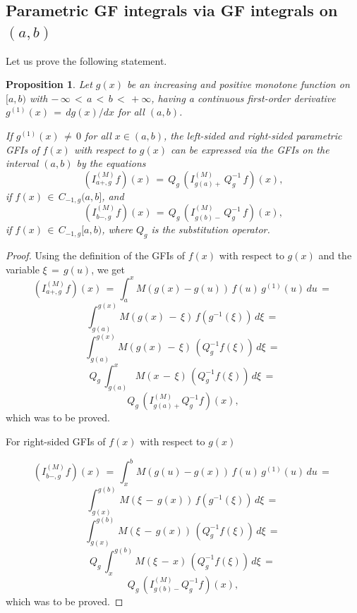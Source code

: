 \documentclass[12pt]{article}
\newtheorem{Proposition}{Proposition}
\begin{document}


\subsection{Parametric GF integrals via GF integrals on $(a,b)$}


Let us prove the following statement.

\begin{Proposition} \label{PGFI-GFIab}
Let $g(x)$ be an increasing and positive monotone function on $[a, b)$ 
with $ - \, \infty \, < \, a \, < \, b \, < \, +\infty$, 
having a continuous first-order derivative $g^{(1)}(x) \, = \, dg(x)/dx$ for all $(a,b)$.

If $g^{(1)}(x) \, \ne \, 0$ for all $x \in (a,b)$,
the left-sided and right-sided parametric GFIs of $f(x)$ with respect to $g(x)$ can be expressed via 
the GFIs on the interval $(a,b)$ by the equations
\begin{equation} \label{I-QIQ-l}
(I^{(M)}_{a+,g} f)(x) \, = \, 
Q_{g} \, (I^{(M)}_{g(a)+} \, Q^{-1}_g \, f)(x) ,
\end{equation}
if $f(x) \, \in \,C_{-1,g}(a,b]$, and
\begin{equation} \label{I-QIQ-r}
(I^{(M)}_{b-,g} f)(x) \, = \, 
Q_{g} \, (I^{(M)}_{g(b)-} \, Q^{-1}_g \, f)(x) ,
\end{equation}
if $f(x) \, \in \, C_{-1,g}[a,b)$, 
where $Q_g$ is the substitution operator.

\end{Proposition}


\begin{proof}

Using the definition of the GFIs of $f(x)$ with respect to $g(x)$
and the variable $\xi \, = \, g(u)$, we get
\[
(I^{(M)}_{a+,g} f)(x) \, = \, 
\int^x_a M(g(x)-g(u)) \, f(u) \, g^{(1)}(u) \, du 
\, = \, 
\]
\[
\int^{g(x)}_{g(a)} M(g(x) \, - \, \xi) \, 
f(g^{-1}(\xi)) \, d \xi 
\, = \, 
\]
\[
\int^{g(x)}_{g(a)} M(g(x) \, - \, \xi) \, 
(Q^{-1}_g f(\xi)) \, d \xi 
\, = \, 
\]
\[
Q_{g} \, \int^{x}_{g(a)} M(x \, - \, \xi) \, 
(Q^{-1}_g f(\xi)) \, d \xi 
\, = \, 
\]
\[
Q_{g} \, (I^{(M)}_{g(a)+} Q^{-1}_g f)(x) ,
\]
which was to be proved. 

For right-sided GFIs of $f(x)$ with respect to $g(x)$

\[
(I^{(M)}_{b-,g} f)(x) \, = \, 
\int^b_x M(g(u)-g(x)) \, f(u) \, g^{(1)}(u) \, du 
\, = \, 
\]
\[
\int^{g(b)}_{g(x)} M(\xi \, - \, g(x)) \, 
f(g^{-1}(\xi)) \, d \xi 
\, = \, 
\]
\[
\int^{g(b)}_{g(x)}M(\xi \, - \, g(x)) \, 
(Q^{-1}_g f(\xi)) \, d \xi 
\, = \, 
\]
\[
Q_{g} \, \int^{g(b)}_{x} M(\xi \, - \, x) \, 
(Q^{-1}_g f(\xi)) \, d \xi 
\, = \, 
\]
\[
Q_{g} \, (I^{(M)}_{g(b)-} Q^{-1}_g f)(x) ,
\]
which was to be proved. 


\end{proof}
\end{document}
